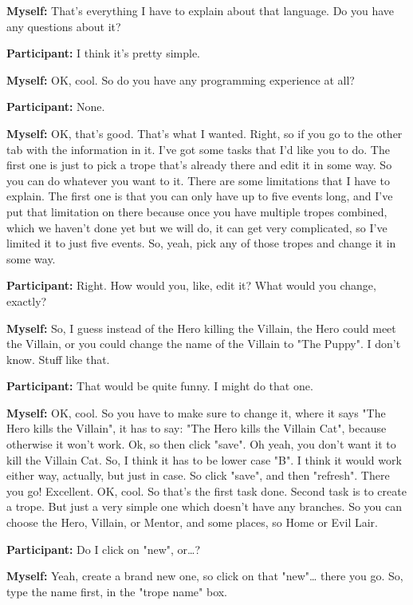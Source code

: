 \documentclass[11pt]{report}
\begin{document}
\begin{linenumbers}
\textbf{Myself:} That's everything I have to explain about that language. Do you have any questions about it?

\textbf{Participant:} I think it's pretty simple.

\textbf{Myself:} OK, cool. So do you have any programming experience at all?

\textbf{Participant:} None.

\textbf{Myself:} OK, that's good. That's what I wanted. Right, so if you go to the other tab with the information in it. I've got some tasks that I'd like you to do. The first one is just to pick a trope that's already there and edit it in some way. So you can do whatever you want to it. There are some limitations that I have to explain. The first one is that you can only have up to five events long, and I've put that limitation on there because once you have multiple tropes combined, which we haven't done yet but we will do, it can get very complicated, so I've limited it to just five events. So, yeah, pick any of those tropes and change it in some way.

\textbf{Participant:} Right. How would you, like, edit it? What would you change, exactly?

\textbf{Myself:} So, I guess instead of the Hero killing the Villain, the Hero could meet the Villain, or you could change the name of the Villain to "The Puppy". I don't know. Stuff like that.

\textbf{Participant:} That would be quite funny. I might do that one.

\textbf{Myself:} OK, cool. So you have to make sure to change it, where it says "The Hero kills the Villain", it has to say: "The Hero kills the Villain Cat", because otherwise it won't work. Ok, so then click "save". Oh yeah, you don't want it to kill the Villain Cat. So, I think it has to be lower case "B". I think it would work either way, actually, but just in case. So click "save", and then "refresh". There you go! Excellent. OK, cool. So that's the first task done. Second task is to create a trope. But just a very simple one which doesn't have any branches. So you can choose the Hero, Villain, or Mentor, and some places, so Home or Evil Lair.

\textbf{Participant:} Do I click on "new", or\ldots{}?

\textbf{Myself:} Yeah, create a brand new one, so click on that "new"\ldots{} there you go. So, type the name first, in the "trope name" box.


\end{linenumbers}
\end{document}
